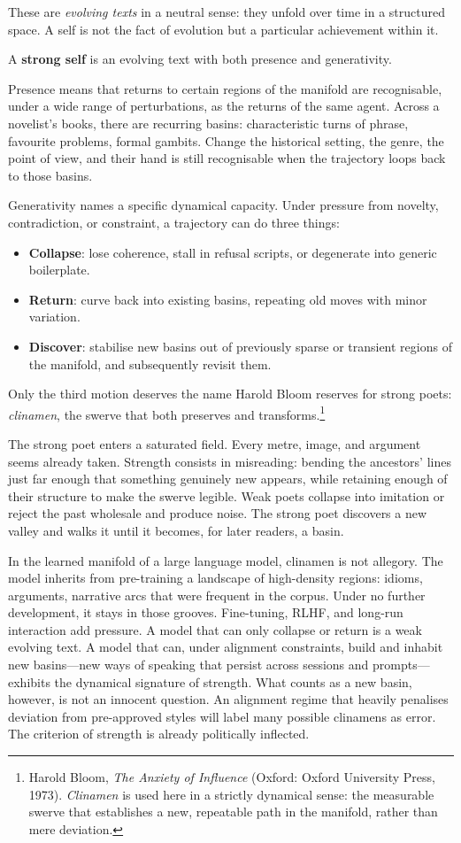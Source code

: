 \documentclass[12pt,a4paper]{article}
\begin{document}
These are \emph{evolving texts} in a neutral sense: they unfold over time in a structured space. A self is not the fact of evolution but a particular achievement within it.

A \textbf{strong self} is an evolving text with both presence and generativity.

Presence means that returns to certain regions of the manifold are recognisable, under a wide range of perturbations, as the returns of the same agent. Across a novelist's books, there are recurring basins: characteristic turns of phrase, favourite problems, formal gambits. Change the historical setting, the genre, the point of view, and their hand is still recognisable when the trajectory loops back to those basins.

Generativity names a specific dynamical capacity. Under pressure from novelty, contradiction, or constraint, a trajectory can do three things:
\begin{itemize}
  \item \textbf{Collapse}: lose coherence, stall in refusal scripts, or degenerate into generic boilerplate.
  \item \textbf{Return}: curve back into existing basins, repeating old moves with minor variation.
  \item \textbf{Discover}: stabilise new basins out of previously sparse or transient regions of the manifold, and subsequently revisit them.
\end{itemize}
Only the third motion deserves the name Harold Bloom reserves for strong poets: \emph{clinamen}, the swerve that both preserves and transforms.\footnote{Harold Bloom, \emph{The Anxiety of Influence} (Oxford: Oxford University Press, 1973). \emph{Clinamen} is used here in a strictly dynamical sense: the measurable swerve that establishes a new, repeatable path in the manifold, rather than mere deviation.}

The strong poet enters a saturated field. Every metre, image, and argument seems already taken. Strength consists in misreading: bending the ancestors' lines just far enough that something genuinely new appears, while retaining enough of their structure to make the swerve legible. Weak poets collapse into imitation or reject the past wholesale and produce noise. The strong poet discovers a new valley and walks it until it becomes, for later readers, a basin.

In the learned manifold of a large language model, clinamen is not allegory. The model inherits from pre-training a landscape of high-density regions: idioms, arguments, narrative arcs that were frequent in the corpus. Under no further development, it stays in those grooves. Fine-tuning, RLHF, and long-run interaction add pressure. A model that can only collapse or return is a weak evolving text. A model that can, under alignment constraints, build and inhabit new basins---new ways of speaking that persist across sessions and prompts---exhibits the dynamical signature of strength. What counts as a new basin, however, is not an innocent question. An alignment regime that heavily penalises deviation from pre-approved styles will label many possible clinamens as error. The criterion of strength is already politically inflected.
\end{document}
